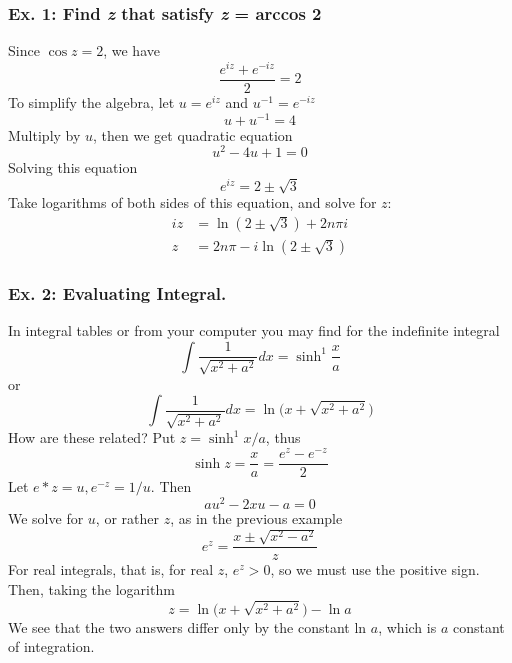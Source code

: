 \documentclass[../main.tex]{subfiles}
\begin{document}
\subsubsection*{Ex. 1: Find \emph{z} that satisfy \emph{z} = arccos 2} Since $\cos z=2$, we have
\begin{equation*}
    \frac{e^{iz}+e^{-iz}}{2}=2
\end{equation*}
To simplify the algebra, let $u = e^{iz}$ and $ u^{-1}=e^{-iz}$
\begin{equation*}
    u+u^{-1}=4
\end{equation*}
Multiply by $u$, then we get quadratic equation
\begin{equation*}
    u^2-4u+1=0
\end{equation*} 
Solving this equation
\begin{equation*}
    e^{iz}=2\pm\sqrt{3}
\end{equation*}
Take logarithms of both sides of this equation, and solve for $z$:
\begin{align*}
    iz&=\ln (2\pm\sqrt{3})+2n\pi i\\
    z&=2n\pi -i\ln (2\pm\sqrt{3})
\end{align*}

\subsubsection*{Ex. 2: Evaluating Integral.} In integral tables or from your computer you may find for the indefinite integral
\begin{equation*}
    \int \frac{1}{\sqrt{x^2+a^2}}dx    =\sinh^1\frac{x}{a}
\end{equation*}
or
\begin{equation*}
    \int \frac{1}{\sqrt{x^2+a^2}}dx    =\ln\big(x+\sqrt{x^2+a^2}\big)
\end{equation*}
How are these related? Put $z=\sinh^1 x/a$, thus
\begin{equation*}
    \sinh z=\frac{x}{a}=\frac{e^z-e^{-z}}{2}
\end{equation*}
Let $e*z = u, e^{-z} = 1/u$. Then
\begin{equation*}
    au^2 - 2xu - a = 0
\end{equation*}
We solve for $u$, or rather $z$, as in the previous example
\begin{equation*}
    e^z=\frac{x\pm\sqrt{x^2-a^2}}{z}
\end{equation*}
For real integrals, that is, for real $z$, $e^z > 0$, so we must use the positive sign. Then,
taking the logarithm
\begin{equation*}
    z=\ln\big(x+\sqrt{x^2+a^2}\big)-\ln a
\end{equation*}
We see that the two answers differ only by the constant ln $a$, which is $a$ constant of integration.
\end{document}
